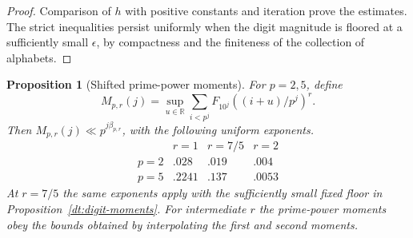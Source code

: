 \documentclass[11pt,a4paper]{article}
\theoremstyle{paperplain}
\newtheorem{proposition}[theorem]{Proposition}
\numberwithin{equation}{section}
\begin{document}
\begin{proof}
Comparison of \(h\) with positive constants and iteration prove
the estimates. The strict inequalities persist uniformly when
the digit magnitude is floored at a sufficiently small
\(\epsilon\), by compactness and the finiteness of the collection
of alphabets.
\end{proof}

\begin{proposition}[Shifted prime-power moments]\label{dt:digit-pure}
For \(p=2,5\), define
\[
 M_{p,r}(j)=\sup_{u\in\mathbb R}
            \sum_{i<p^j} F_{10^j}((i+u)/p^j)^r.
\]
Then \(M_{p,r}(j)\ll p^{j\beta_{p,r}}\), with the following
uniform exponents.
\[
\begin{array}{c|ccc}
  &r=1&r=7/5&r=2\\ \hline
 p=2& .028& .019& .004\\
 p=5& .2241& .137& .0053
\end{array}
\]
At \(r=7/5\) the same exponents apply with the sufficiently small
fixed floor in Proposition~\ref{dt:digit-moments}. For intermediate
\(r\) the prime-power moments obey the bounds obtained by
interpolating the first and second moments.
\end{proposition}
\end{document}
